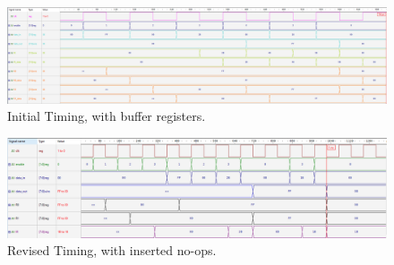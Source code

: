 \documentclass{article}
\begin{document}
\begin{figure}[ht!]
    \centering
    \includegraphics[width=\textwidth]{./_img/Bad_Timing.PNG}
    \caption{Initial Timing, with buffer registers.}
    \label{fig:bad_timing}
\end{figure}

\begin{figure}[ht!]
    \centering
    \includegraphics[width=\textwidth]{./_img/Good_Timing.PNG}
    \caption{Revised Timing, with inserted no-ops.}
    \label{fig:good_timing}
\end{figure}

\pagebreak
\newpage

{}
\end{document}
